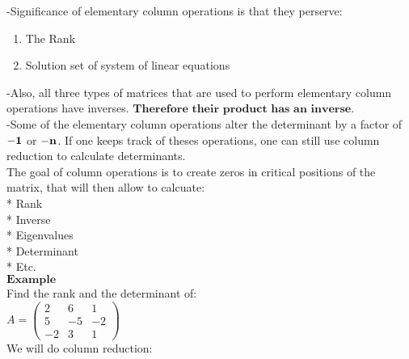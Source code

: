 \documentclass[]{article}
\begin{document}
-Significance of elementary column operations is that they perserve:

\begin{enumerate}
\def\labelenumi{\arabic{enumi})}
\item
  The Rank
\item
  Solution set of system of linear equations
\end{enumerate}

-Also, all three types of matrices that are used to perform elementary
column operations have inverses.
\(\textbf{Therefore their product has an inverse.}\)\\

-Some of the elementary column operations alter the determinant by a
factor of \(\bold{-1}\) or \(\bold{-n}\). If one keeps track of theses
operations, one can still use column reduction to calculate
determinants.\\

The goal of column operations is to create zeros in critical positions
of the matrix, that will then allow to calcuate:\\
 * Rank\\
 * Inverse\\
 * Eigenvalues\\
 * Determinant\\
 * Etc.\\

\(\mathbf{Example}\)\\

Find the rank and the determinant of:\\

\(A =\begin{pmatrix} 2 & 6 & 1\\ 5 & -5 & -2 \\ -2 & 3 & 1 \end{pmatrix}\)\\

We will do column reduction:\\
 \hspace{4 cm}
\begingroup
 
\end{document}
